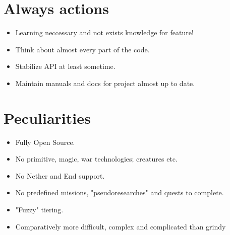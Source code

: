 \documentclass[12pt]{article}
\begin{document}
	\section{Always actions}

	\begin{itemize}
		\item Learning neccessary and not exists knowledge for feature!
		\item Think about almost every part of the code.
		\item Stabilize API at least sometime.
		\item Maintain manuals and docs for project almost up to date.
	\end{itemize}

	\section{Peculiarities}

	\begin{itemize}
		\item Fully Open Source.
		\item No primitive, magic, war technologies; creatures etc.
		\item No Nether and End support.
		\item No predefined missions, "pseudoresearches" and quests to complete.
		\item "Fuzzy" tiering.
		\item Comparatively more difficult, complex and complicated than grindy
	\end{itemize}
\end{document}
